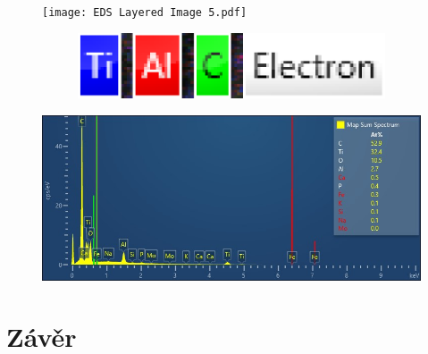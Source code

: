 \documentclass[a4paper,12pt]{article}
\begin{document}
\begin{figure}[h!]
	\centering
	\texttt{[image: EDS Layered Image 5.pdf]}

	\begin{subfigure}{0.2\textwidth}
		\vspace*{-60mm}
		\hspace*{65mm}
		\includegraphics[width=\textwidth]{legend.png}
	\end{subfigure}
	\caption{\centering }
	\label{fig:Iab}
\end{figure}

\begin{figure}[h!]
	\centering
	\includegraphics[width=\textwidth]{Map Sum Spectrum.jpeg}
	\caption{\centering }
	\label{fig:spectrum}
\end{figure}

\clearpage
\section{Závěr}

	
	
\end{document}

